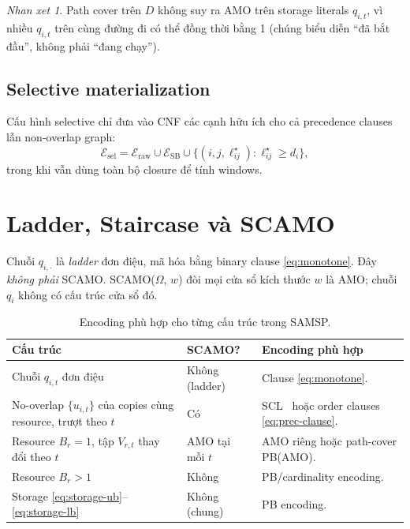 \documentclass[11pt,a4paper]{article}
\theoremstyle{remark}
\newtheorem{remark}[theorem]{Nhan xet}
\begin{document}
\begin{remark}
Path cover trên $D$ không suy ra AMO trên storage literals $q_{i,t}$,
vì nhiều $q_{i,t}$ trên cùng đường đi có thể đồng thời bằng 1
(chúng biểu diễn ``đã bắt đầu'', không phải ``đang chạy'').
\end{remark}

\subsection{Selective materialization}

Cấu hình selective chỉ đưa vào CNF các cạnh hữu ích cho cả precedence
clauses lẫn non-overlap graph:
\[
  \mathcal{E}_\mathrm{sel} =
  \mathcal{E}_\mathrm{raw}
  \cup \mathcal{E}_\mathrm{SB}
  \cup \{(i,j,\ell^\star_{ij}) : \ell^\star_{ij} \ge d_i\},
\]
trong khi vẫn dùng toàn bộ closure để tính windows.

\section{Ladder, Staircase và SCAMO}
\label{sec:staircase}

Chuỗi $q_{i,\cdot}$ là \emph{ladder} đơn điệu, mã hóa bằng binary clause
\eqref{eq:monotone}. Đây \emph{không phải} SCAMO.
SCAMO($\Omega$, $w$) đòi mọi cửa sổ kích thước $w$ là AMO; chuỗi $q_i$
không có cấu trúc cửa sổ đó.

\begin{table}[htbp]
\centering
\caption{Encoding phù hợp cho từng cấu trúc trong SAMSP.}
\label{tab:scamo}
\begin{tabularx}{\textwidth}{@{}p{}p{}Y@{}}
\toprule
\textbf{Cấu trúc} & \textbf{SCAMO?} & \textbf{Encoding phù hợp}\\
\midrule
Chuỗi $q_{i,t}$ đơn điệu & Không (ladder) & Clause \eqref{eq:monotone}.\\
No-overlap $\{u_{i,t}\}$ của copies cùng resource, trượt theo $t$
  & Có & SCL~\cite{truong2025scl} hoặc order clauses \eqref{eq:prec-clause}.\\
Resource $B_r = 1$, tập $V_{r,t}$ thay đổi theo $t$
  & AMO tại mỗi $t$ & AMO riêng hoặc path-cover PB(AMO).\\
Resource $B_r > 1$ & Không & PB/cardinality encoding.\\
Storage \eqref{eq:storage-ub}--\eqref{eq:storage-lb} & Không (chung)
  & PB encoding.\\
\bottomrule
\end{tabularx}
\end{table}
\end{document}
